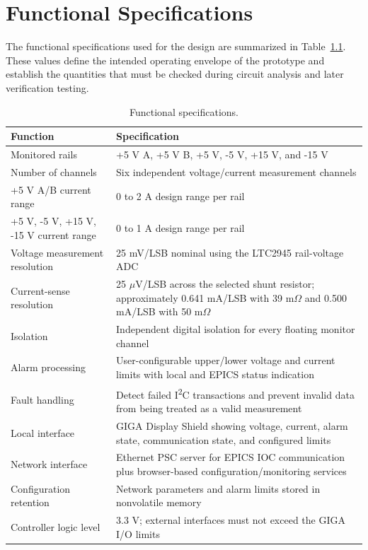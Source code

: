 \chapter{Functional Specifications}
\label{app:functional_specs}
The functional specifications used for the design are summarized in
Table~\ref{tab:functional-specifications}. These values define the intended
operating envelope of the prototype and establish the quantities that must be
checked during circuit analysis and later verification testing.

\begin{table}[H]
    \centering
    \caption{Functional specifications.}
    \label{tab:functional-specifications}
    \begin{tabularx}{\textwidth}{>{\raggedright\arraybackslash}p{}X}
        \toprule
        \textbf{Function} & \textbf{Specification} \\
        \midrule
        Monitored rails & +5 V A, +5 V B, +5 V, -5 V, +15 V, and -15 V \\
        Number of channels & Six independent voltage/current measurement channels \\
        +5 V A/B current range & 0 to 2 A design range per rail \\
        +5 V, -5 V, +15 V, -15 V current range & 0 to 1 A design range per rail \\
        Voltage measurement resolution & 25 mV/LSB nominal using the LTC2945 rail-voltage ADC \\
        Current-sense resolution & 25 \(\mu\)V/LSB across the selected shunt resistor; approximately 0.641 mA/LSB with 39 m\(\Omega\) and 0.500 mA/LSB with 50 m\(\Omega\) \\
        Isolation & Independent digital isolation for every floating monitor channel \\
        Alarm processing & User-configurable upper/lower voltage and current limits with local and EPICS status indication \\
        Fault handling & Detect failed I\textsuperscript{2}C transactions and prevent invalid data from being treated as a valid measurement \\
        Local interface & GIGA Display Shield showing voltage, current, alarm state, communication state, and configured limits \\
        Network interface & Ethernet PSC server for EPICS IOC communication plus browser-based configuration/monitoring services \\
        Configuration retention & Network parameters and alarm limits stored in nonvolatile memory \\
        Controller logic level & 3.3 V; external interfaces must not exceed the GIGA I/O limits \\
        \bottomrule
    \end{tabularx}
\end{table}
